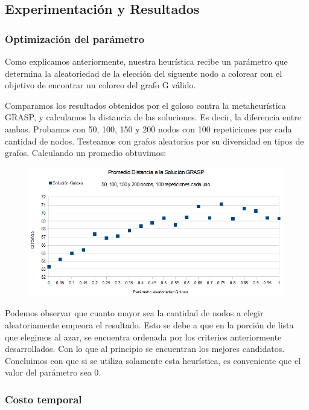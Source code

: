 \subsection{Experimentación y Resultados}


\subsubsection{Optimización del parámetro}

\quad Como explicamos anteriormente, nuestra heurística recibe un parámetro que determina la aleatoriedad de la elección del siguente nodo a colorear con el objetivo de encontrar un coloreo del grafo G válido.

\quad Comparamos los resultados obtenidos por el goloso contra la metaheurística GRASP, y calculamos la distancia de las soluciones. Es decir, la diferencia entre ambas. Probamos con 50, 100, 150 y 200 nodos con 100 repeticiones por cada cantidad de nodos. Testeamos con grafos aleatorios por su diversidad en tipos de grafos. Calculando un promedio obtuvimos:

\begin{figure}[H]
	\centering
	\includegraphics[scale=0.6]{optimizacionGoloso.png}
\end{figure}

\quad Podemos observar que cuanto mayor sea la cantidad de nodos a elegir aleatoriamente empeora el resultado. Esto se debe a que en la porción de lista que elegimos al azar, se encuentra ordenada por los criterios anteriormente desarrollados. Con lo que al principio se encuentran los mejores candidatos. Concluimos con que si se utiliza solamente esta heurística, es conveniente que el valor del parámetro sea 0.

\subsubsection{Costo temporal}

